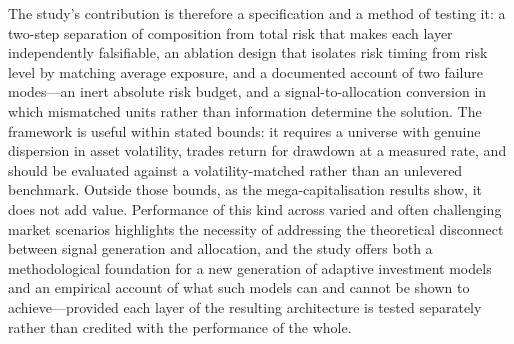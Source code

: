 The study's contribution is therefore a specification and a method of testing it: a
two-step separation of composition from total risk that makes each layer independently
falsifiable, an ablation design that isolates risk timing from risk level by matching
average exposure, and a documented account of two failure modes---an inert absolute risk
budget, and a signal-to-allocation conversion in which mismatched units rather than
information determine the solution. The framework is useful within stated bounds: it
requires a universe with genuine dispersion in asset volatility, trades return for
drawdown at a measured rate, and should be evaluated against a volatility-matched rather
than an unlevered benchmark. Outside those bounds, as the mega-capitalisation results
show, it does not add value. Performance of this kind across varied and often challenging
market scenarios highlights the necessity of addressing the theoretical disconnect between
signal generation and allocation, and the study offers both a methodological foundation
for a new generation of adaptive investment models and an empirical account of what such
models can and cannot be shown to achieve---provided each layer of the resulting
architecture is tested separately rather than credited with the performance of the whole.
